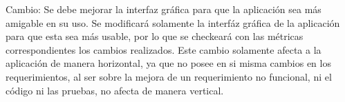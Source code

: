 Cambio: Se debe mejorar la interfaz gráfica para que la aplicación sea más amigable en su
uso.
Se modificará solamente la interfáz gráfica de la aplicación para que esta sea más usable, por lo que se checkeará con las métricas correspondientes los cambios realizados. Este cambio solamente afecta a la aplicación de manera horizontal, ya que no posee en si misma cambios en los requerimientos, al ser sobre la mejora de un requerimiento no funcional, ni el código ni las pruebas, no afecta de manera vertical.



\begin{comment}
    Casos de uso:
        - Gestionar información básica de un perro
        - Registrar en calendario los paseos
        - Calendario de alimentacion de la mascota
        - Registro de actividad realizada
        - Agendar servicio de cuidado en una veterinaria
        - Recordatorios via email
        
    Inicio de sesión
    Registro de animales
    Registro de padrinos
    Mejora interfaz gráfica
    
    \prettyTable{|l|l|l|l|l|l|l|l|}{
                    & \rotatebox{90}{\tiny{Gestionar información basica}} & & & & & & \\ \hline
    Requerimientos  & & & & & & & \\ \hline
    Diseño          & & & & & & & \\ \hline
    Código          & & & & & & & \\ \hline
    Casos de prueba & & & & & & & \\ \hline
}

\end{comment}